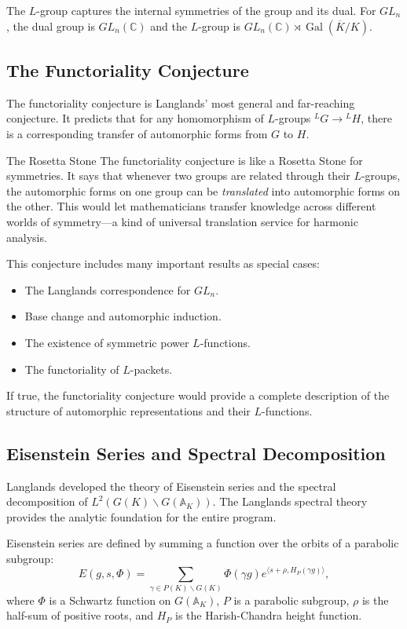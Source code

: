 The $L$-group captures the internal symmetries of the group and its dual. For $GL_n$, the dual group is $GL_n(\mathbb{C})$ and the $L$-group is $GL_n(\mathbb{C}) \rtimes \operatorname{Gal}(\overline{K}/K)$.

\subsection{The Functoriality Conjecture}

The functoriality conjecture is Langlands' most general and far-reaching conjecture. It predicts that for any homomorphism of $L$-groups ${}^L G \to {}^L H$, there is a corresponding transfer of automorphic forms from $G$ to $H$.

\begin{analogy}{The Rosetta Stone}
The functoriality conjecture is like a Rosetta Stone for symmetries.
It says that whenever two groups are related through their $L$-groups,
the automorphic forms on one group can be \emph{translated} into
automorphic forms on the other. This would let mathematicians transfer
knowledge across different worlds of symmetry---a kind of universal
translation service for harmonic analysis.
\end{analogy}

This conjecture includes many important results as special cases:
\begin{itemize}
\item The Langlands correspondence for $GL_n$.
\item Base change and automorphic induction.
\item The existence of symmetric power $L$-functions.
\item The functoriality of $L$-packets.
\end{itemize}

If true, the functoriality conjecture would provide a complete description of the structure of automorphic representations and their $L$-functions.

\subsection{Eisenstein Series and Spectral Decomposition}

Langlands developed the theory of Eisenstein series and the spectral decomposition of $L^2(G(K)\backslash G(\mathbb{A}_K))$. The Langlands spectral theory provides the analytic foundation for the entire program.

Eisenstein series are defined by summing a function over the orbits of a parabolic subgroup:
\[
E(g, s, \Phi) = \sum_{\gamma \in P(K) \backslash G(K)} \Phi(\gamma g) e^{\langle s + \rho, H_P(\gamma g) \rangle},
\]
where $\Phi$ is a Schwartz function on $G(\mathbb{A}_K)$, $P$ is a parabolic subgroup, $\rho$ is the half-sum of positive roots, and $H_P$ is the Harish-Chandra height function.

